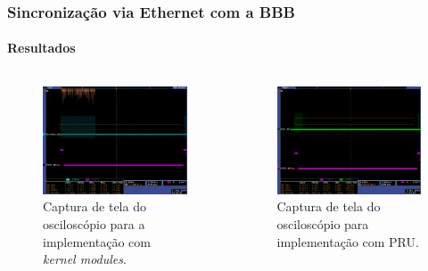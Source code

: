 \begin{frame}
\frametitle{Sincronização via Ethernet com a BBB }
\framesubtitle{Resultados}

\vspace{-24pt}

\begin{columns}

\begin{column}{.5\textwidth}

\begin{figure}[h!]
\centering
\includegraphics[scale=0.16]{image/tek_com_threads}
\caption {\centering Captura de tela do osciloscópio para a implementação com
\textit{kernel modules}.}
\label{fig:osciloscopio_thread}
\end{figure}
\end{column}
		  
\begin{column}{.5\textwidth}

\begin{figure}[h!]
\centering
\includegraphics[scale=0.16]{image/tek_pru}
\caption {\centering Captura de tela do osciloscópio para implementação com
PRU.}
\label{fig:pru_osciloscopio_thread}
\end{figure}
\end{column}

\end{columns}
\end{frame}